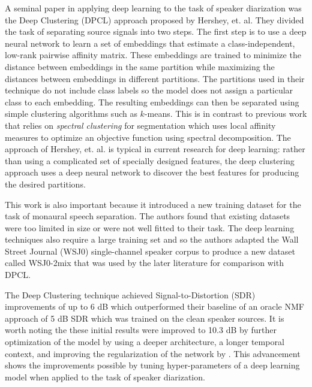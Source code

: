 \documentclass[journal, a4paper]{IEEEtran}
\begin{document}
A seminal paper in applying deep learning to the task of speaker diarization was the Deep Clustering (DPCL) \cite{DBLP:journals/corr/HersheyCRW15} approach proposed by Hershey, et. al. They divided the task of separating source signals into two steps. The first step is to use a deep neural network to learn a set of embeddings that estimate a class-independent, low-rank pairwise affinity matrix. These embeddings are trained to minimize the distance between embeddings in the same partition while maximizing the distances between embeddings in different partitions. The partitions used in their technique do not include class labels so the model does not assign a particular class to each embedding. The resulting embeddings can then be separated using simple clustering algorithms such as $k$-means. This is in contrast to previous work that relies on \textit{spectral clustering} for segmentation which uses local affinity measures to optimize an objective function using spectral decomposition. The approach of Hershey, et. al. is typical in current research for deep learning: rather than using a complicated set of specially designed features, the deep clustering approach uses a deep neural network to discover the best features for producing the desired partitions.

This work is also important because it introduced a new training dataset for the task of monaural speech separation. The authors found that existing datasets were too limited in size or were not well fitted to their task. The deep learning techniques also require a large training set and so the authors adapted the Wall Street Journal (WSJ0) \cite{garofolo:wsj0} single-channel speaker corpus to produce a new dataset called WSJ0-2mix \cite{WSJmix} that was used by the later literature for comparison with DPCL.

The Deep Clustering technique achieved Signal-to-Distortion (SDR) improvements of up to 6 dB which outperformed their baseline of an oracle NMF approach of 5 dB SDR which was trained on the clean speaker sources. It is worth noting the these initial results were improved to 10.3 dB by further optimization of the model by using a deeper architecture, a longer temporal context, and improving the regularization of the network by \cite{DBLP:journals/corr/IsikRCWH16}. This advancement shows the improvements possible by tuning hyper-parameters of a deep learning model when applied to the task of speaker diarization.
\end{document}
